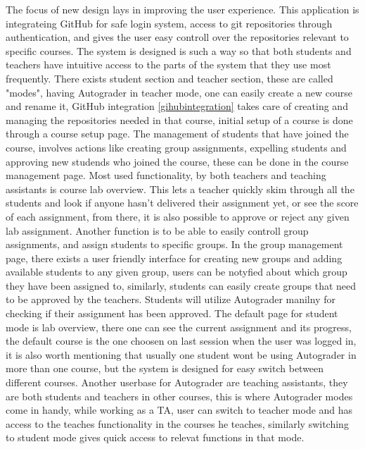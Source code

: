 The focus of new design lays in improving the user experience. This application is integrateing GitHub for safe login system, access to git repositories through authentication, and gives the user easy controll over the repositories relevant to specific courses. The system is designed is such a way so that both students and teachers have intuitive access to the parts of the system that they use most frequently. There exists student section and teacher section, these are called "modes", having Autograder in teacher mode, one can easily create a new course and rename it, GitHub integration \ref{gihubintegration} takes care of creating and managing the repositories needed in that course, initial setup of a course is done through a course setup page. The management of students that have joined the course, involves actions like creating group assignments, expelling students and approving new studends who joined the course, these can be done in the course management page. Most used functionality, by both teachers and teaching assistants is course lab overview. This lets a teacher quickly skim through all the students and look if anyone hasn't delivered their assignment yet, or see the score of each assignment, from there, it is also possible to approve or reject any given lab assignment. Another function is to be able to easily controll group assignments, and assign students to specific groups. In the group management page, there exists a user friendly interface for creating new groups and adding available students to any given group, users can be notyfied about which group they have been assigned to, similarly, students can easily create groups that need to be approved by the teachers. Students will utilize Autograder manilny for checking if their assignment has been approved. The default page for student mode is lab overview, there one can see the current assignment and its progress, the default course is the one choosen on last session when the user was logged in, it is also worth mentioning that usually one student wont be using Autograder in more than one course, but the system is designed for easy switch between different courses. Another userbase for Autograder are teaching assistants, they are both students and teachers in other courses, this is where Autograder modes come in handy, while working as a TA, user can switch to teacher mode and has access to the teaches functionality in the courses he teaches, similarly switching to student mode gives quick access to relevat functions in that mode.
